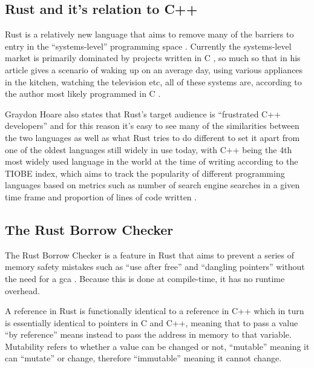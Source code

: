 \documentclass[a4paper]{article}
\begin{document}
\subsection{Rust and it's relation to C++}
Rust is a relatively new language that aims to remove many of the barriers to entry in the	``systems-level'' programming space \parencite{rust-book1}. Currently the systems-level market is primarily dominated by projects written in C \parencite{embedded-langauges}, so much so that in his article  \citeauthor{c-language-blog} gives a scenario of waking up on an average day, using various appliances in the kitchen, watching the television etc, all of these systems are, according to the author most likely programmed in C \parencite{c-language-blog}.

Graydon Hoare also states that Rust's target audience is ``frustrated C++ developers'' \parencite{rust-interview} and for this reason it's easy to see many of the similarities between the two languages as well as what Rust tries to do different to set it apart from one of the oldest languages still widely in use today, with C++ being the 4th most widely used language in the world at the time of writing according to the TIOBE index, which aims to track the popularity of different programming languages based on metrics such as number of search engine searches in a given time frame and proportion of lines of code written \parencite{tiobe-index}.

\subsection{The Rust Borrow Checker} \label{section:rust-borrow-checker}
The Rust Borrow Checker is a feature in Rust that aims to prevent a series of memory safety mistakes such as ``use after free'' and ``dangling pointers'' without the need for a \gls{gca} \parencite{memory-safety-in-rust}. Because this is done at compile-time, it has no runtime overhead.

A reference in Rust is functionally identical to a reference in C++ which in turn is essentially identical to pointers in C and C++, meaning that to pass a value ``by reference'' means instead to pass the address in memory to that variable. Mutability refers to whether a value can be changed or not, ``mutable'' meaning it can ``mutate'' or change, therefore ``immutable'' meaning it cannot change.
\end{document}

